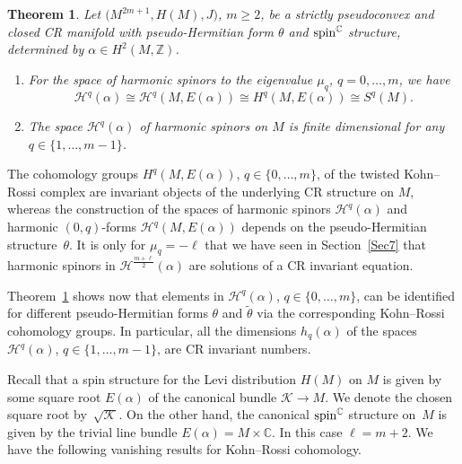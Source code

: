 \documentclass[10pt,a4paper]{amsart}
\numberwithin{equation}{section}
\newtheorem{Theorem}{Theorem}[section]
\newcommand{\ZZ}{\mathbb{Z}}
\newcommand{\CC}{\mathbb{C}}
\begin{document}
\begin{Theorem} \label{SKR} Let $\big(M^{2m+1}, H(M),J\big)$, $m\geq 2$, be a strictly pseudoconvex and closed CR manifold
with pseudo-Hermitian form $\theta$ and ${\rm spin}^\CC$ structure, determined by $\alpha\in H^2(M,\ZZ)$.
\begin{enumerate}\itemsep=0pt
\item[$1.$] For the space of harmonic spinors to the eigenvalue $\mu_q$, $q=0,\dots,m$, we have
\[
\mathcal{H}^q(\alpha) \cong \mathcal{H}^q(M,E(\alpha)) \cong H^q(M,E(\alpha)) \cong S^q(M).\]
\item[$2.$] The space $\mathcal{H}^q(\alpha)$ of harmonic spinors
on $M$ is finite dimensional for any $q\in\{1,\dots,m-1\}$.
\end{enumerate}
\end{Theorem}

\begin{Remark} The cohomology groups $H^q(M,E(\alpha))$, $q\in\{0,\dots,m\}$, of the twisted Kohn--Rossi complex are invariant objects of the underlying CR structure on $M$, whereas the construction of the spaces of harmonic spinors $\mathcal{H}^q(\alpha)$ and harmonic $(0,q)$-forms $\mathcal{H}^q(M,E(\alpha))$ depends on the pseudo-Hermitian structure~$\theta$. It is only for $\mu_q=-\ell$ that we have seen in Section~\ref{Sec7} that harmonic spinors in $\mathcal{H}^{\frac{m+\ell}{2}}(\alpha)$ are solutions of a CR invariant equation.

Theorem~\ref{SKR} shows now that elements
in $\mathcal{H}^q(\alpha)$, $q\in\{0,\dots,m\}$, can be identified for different pseudo-Hermitian forms $\theta$ and $\tilde{\theta}$ via the corresponding
Kohn--Rossi cohomology groups. In particular, all the dimensions $h_q(\alpha)$ of the spaces $\mathcal{H}^q(\alpha)$, $q\in\{1,\dots,m-1\}$, are CR invariant numbers.
\end{Remark}

Recall that a spin structure for the Levi distribution $H(M)$ on $M$ is given by some square root $E(\alpha)$
of the canonical bundle $\mathcal{K}\to M$. We denote the chosen square root by~$\sqrt{\mathcal{K}}$.
On the other hand, the canonical ${\rm spin}^\CC$ structure on~$M$ is given by the trivial line bundle $E(\alpha)=M\times\CC$.
In this case $\ell=m+2$. We have the following vanishing results for Kohn--Rossi cohomology.
\end{document}
